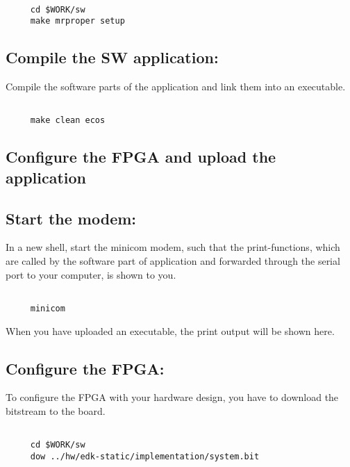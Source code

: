 \documentclass[DIV15,a4paper]{scrartcl}
\begin{document}
\begin{verbatim}

     cd $WORK/sw
     make mrproper setup

\end{verbatim}
     
\subsection*{Compile the SW application:}

Compile the software parts of the application and link them into an executable.

\begin{verbatim}

     make clean ecos

\end{verbatim}
     
\subsection{Configure the FPGA and upload the application}

\subsection*{Start the modem:}

In a new shell, start the minicom modem, such that the print-functions, which are called by the software part
of application and forwarded through the serial port to your computer, is shown to you.

\begin{verbatim}

     minicom

\end{verbatim}
     
When you have uploaded an executable, the print output will be shown here.

\subsection*{Configure the FPGA:}

To configure the FPGA with your hardware design, you have to download the bitstream to the board.

\begin{verbatim}

     cd $WORK/sw
     dow ../hw/edk-static/implementation/system.bit

\end{verbatim}
     
\end{document}
